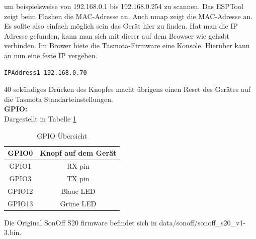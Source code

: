 \documentclass[11pt,fleqn]{book} %
\numberwithin{equation}{section} %
\numberwithin{figure}{section} %
\numberwithin{table}{section} %
\begin{document}
um beispielsweise von 192.168.0.1 bis 192.168.0.254 zu scannen. Das ESPTool zeigt beim Flashen die MAC-Adresse an. Auch nmap zeigt die MAC-Adresse an. Es sollte also einfach möglich sein das Gerät hier zu finden. Hat man die IP Adresse gefunden, kann man sich mit dieser auf dem Browser wie gehabt verbinden. Im Brower biete die Tasmota-Firmware eine Konsole. Hierüber kann an nun eine feste IP vergeben. 
\begin{lstlisting}
IPAddress1 192.168.0.70
\end{lstlisting}
40 sekündiges Drücken des Knopfes macht übrigens einen Reset des Gerätes auf die Tasmota Standarteinstellungen.\\ 
\textbf{GPIO:}\\
Dargestellt in Tabelle \ref{tab:sonoff-gpio}
\begin{table}[H]
\center 
 \begin{tabular}{|c|c|}\hline
GPIO0 & Knopf auf dem Gerät\\ \hline
GPIO1 & RX pin\\ \hline
GPIO3 & TX pin\\ \hline
GPIO12 & Blaue LED\\ \hline
GPIO13 & Grüne LED\\ \hline
 \end{tabular}
 \caption{GPIO Übersicht \label{tab:sonoff-gpio}}
 \end{table}
 Die Original SonOff S20 firmware befindet sich in data/sonoff/sonoff\_s20\_v1-3.bin.
\end{document}
